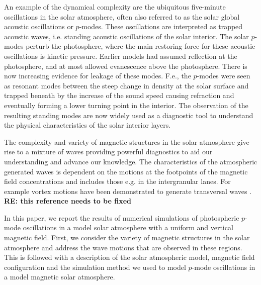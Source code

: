 \documentclass{aastex62}
\begin{document}

An example of the dynamical complexity are the ubiquitous five-minute oscillations in the solar atmosphere, often also referred to as the solar global acoustic oscillations or $p$-modes. These oscillations are interpreted as trapped acoustic waves, i.e. standing acoustic oscillations of the solar interior. The solar $p$-modes perturb the photosphere, where the main restoring force for these acoustic oscillations is kinetic pressure.  Earlier models had assumed reflection at the photosphere, and at most allowed evanescence above the photosphere. There is now increasing evidence for leakage of these modes. F.e., the $p$-modes were seen as resonant modes between the steep change in density at the solar surface and trapped beneath by the increase of the sound speed causing refraction and eventually forming a lower turning point in the interior. The observation of the resulting standing modes are now widely used as a diagnostic tool to understand the physical characteristics of the solar interior layers.

The complexity and variety of magnetic structures in the solar atmosphere give rise to a mixture of waves providing powerful diagnostics to aid our understanding and advance our knowledge. The characteristics of the atmospheric generated waves is dependent on the motions at the footpoints of the magnetic field concentrations and includes those e.g. in the intergranular lanes. For example vortex motions have been demonstrated to generate transversal waves \citet{Fedun2011}. {\bf RE: this reference needs to be fixed}

In this paper, we report the results of numerical simulations of photospheric $p$-mode oscillations in a model solar atmosphere with a uniform and vertical magnetic field. First, we consider the variety of magnetic structures in the solar atmosphere and address the wave motions that are observed in these regions. This is followed with a description of the solar atmospheric model, magnetic field configuration and the simulation method we used to model $p$-mode oscillations in a model magnetic solar atmosphere.
\end{document}
